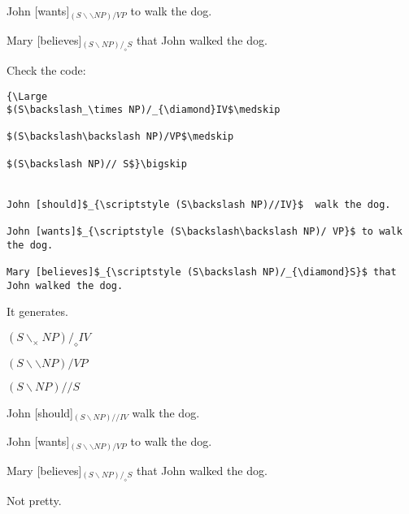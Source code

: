 \documentclass[11pt]{article}
\begin{document}
John [wants]$_{\scriptstyle (S\backslash\backslash NP)/ VP}$ to walk the dog.

Mary [believes]$_{\scriptstyle (S\backslash NP)/_{\diamond}S}$ that John walked the dog.
\newpage

Check the code:\footnotesize

\begin{verbatim}
{\Large 
$(S\backslash_\times NP)/_{\diamond}IV$\medskip

$(S\backslash\backslash NP)/VP$\medskip

$(S\backslash NP)// S$}\bigskip


John [should]$_{\scriptstyle (S\backslash NP)//IV}$  walk the dog.

John [wants]$_{\scriptstyle (S\backslash\backslash NP)/ VP}$ to walk the dog.

Mary [believes]$_{\scriptstyle (S\backslash NP)/_{\diamond}S}$ that John walked the dog.
\end{verbatim}\bigskip


\normalsize It generates. \bigskip

{\Large 
$(S\backslash_\times NP)/_{\diamond}IV$\medskip

$(S\backslash\backslash NP)/VP$\medskip

$(S\backslash NP)// S$}\bigskip


John [should]$_{\scriptstyle (S\backslash NP)//IV}$  walk the dog.

John [wants]$_{\scriptstyle (S\backslash\backslash NP)/ VP}$ to walk the dog.

Mary [believes]$_{\scriptstyle (S\backslash NP)/_{\diamond}S}$ that John walked the dog.\bigskip\bigskip

Not pretty.
\end{document}
